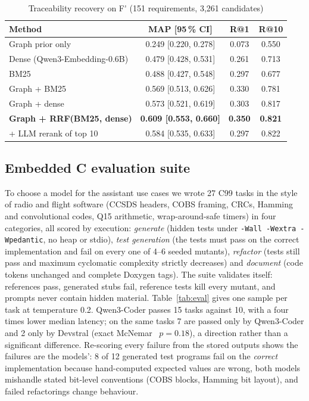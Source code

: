 \documentclass[conference]{IEEEtran}
\newcommand{\Fp}{F\'{}}  %
\newcommand{\tool}[1]{\texttt{#1}}
\begin{document}
\begin{table}[t]
\caption{Traceability recovery on \Fp{} (151 requirements, 3{,}261 candidates)}
\label{tab:trace}
\centering
\footnotesize
\setlength{\tabcolsep}{3pt}
\begin{tabular}{@{}lccc@{}}
\toprule
Method & MAP [95\,\% CI] & R@1 & R@10 \\
\midrule
Graph prior only & 0.249 [0.220, 0.278] & 0.073 & 0.550 \\
Dense (Qwen3-Embedding-0.6B) & 0.479 [0.428, 0.531] & 0.261 & 0.713 \\
BM25 & 0.488 [0.427, 0.548] & 0.297 & 0.677 \\
Graph + BM25 & 0.569 [0.513, 0.626] & 0.330 & 0.781 \\
Graph + dense & 0.573 [0.521, 0.619] & 0.303 & 0.817 \\
\textbf{Graph + RRF(BM25, dense)} & \textbf{0.609 [0.553, 0.660]} & \textbf{0.350} & \textbf{0.821} \\
\quad + LLM rerank of top 10 & 0.584 [0.535, 0.633] & 0.297 & 0.822 \\
\bottomrule
\end{tabular}
\end{table}

\subsection{Embedded C evaluation suite}\label{sec:eval}
To choose a model for the assistant use cases we wrote 27 C99 tasks in the style of radio and flight software
(CCSDS headers, COBS framing, CRCs, Hamming and convolutional codes, Q15 arithmetic, wrap-around-safe timers) in
four categories, all scored by execution: \emph{generate} (hidden tests under \tool{-Wall -Wextra -Wpedantic}, no
heap or stdio), \emph{test generation} (the tests must pass on the correct implementation and fail on every one of
4--6 seeded mutants), \emph{refactor} (tests still pass and maximum cyclomatic complexity strictly decreases) and
\emph{document} (code tokens unchanged and complete Doxygen tags). The suite validates itself: references pass,
generated stubs fail, reference tests kill every mutant, and prompts never contain hidden material.
Table~\ref{tab:eval} gives one sample per task at temperature 0.2. Qwen3-Coder passes 15 tasks against 10, with a
four times lower median latency; on the same tasks 7 are passed only by Qwen3-Coder and 2 only by Devstral (exact
McNemar~\cite{mcnemar1947} $p = 0.18$), a direction rather than a significant difference. Re-scoring every failure
from the stored outputs shows the failures are the models': 8 of 12 generated test programs fail on the
\emph{correct} implementation because hand-computed expected values are wrong, both models mishandle stated
bit-level conventions (COBS blocks, Hamming bit layout), and failed refactorings change behaviour.
\end{document}

